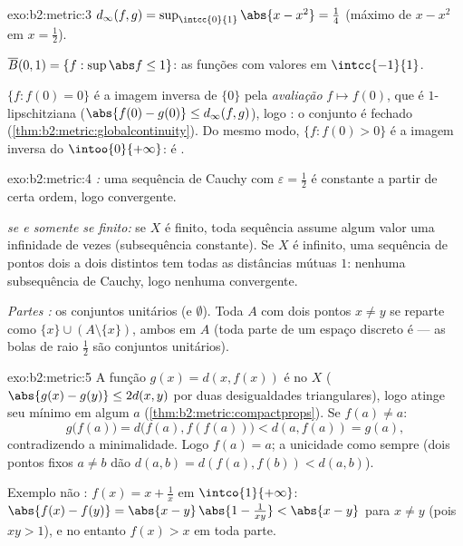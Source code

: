 \begin{solution}{exo:b2:metric:3}
$d_\infty(f, g) = \sup_{\intcc{0}{1}} \abs{x - x^2} = \frac14$
(máximo de $x - x^2$ em $x = \frac12$).

$\overline B(0, 1) = \{f : \sup\abs f \leq 1\}$: as funções
 com valores em $\intcc{-1}{1}$.

$\{f : f(0) = 0\}$ é a imagem inversa de $\{0\}$ pela
\emph{avaliação} $f \mapsto f(0)$, que é $1$-lipschitziana
($\abs{f(0) - g(0)} \leq d_\infty(f,g)$), logo : o conjunto
é fechado (\cref{thm:b2:metric:globalcontinuity}). Do mesmo modo, $\{f :
f(0) > 0\}$ é a imagem inversa do  $\intoo{0}{+\infty}$: é .
\end{solution}

\begin{solution}{exo:b2:metric:4}
\emph{:} uma sequência de Cauchy com $\varepsilon = \frac12$ é
constante a partir de certa ordem, logo convergente.

\emph{ se e somente se finito:} se $X$ é finito, toda sequência assume algum
valor uma infinidade de vezes (subsequência constante). Se $X$ é infinito,
uma sequência de pontos dois a dois distintos tem todas as distâncias mútuas $1$:
nenhuma subsequência de Cauchy, logo nenhuma convergente.

\emph{Partes :} os conjuntos unitários (e $\emptyset$). Toda $A$
com dois pontos $x \neq y$ se reparte como $\{x\} \cup (A
\setminus\{x\})$, ambos  em $A$ (toda parte de um espaço
discreto é  --- as bolas de raio $\frac12$ são conjuntos unitários).
\end{solution}

\begin{solution}{exo:b2:metric:5}
A função $g(x) = d(x, f(x))$ é  no  $X$
($\abs{g(x) - g(y)} \leq 2d(x,y)$ por duas desigualdades triangulares), logo
atinge seu mínimo em algum $a$
(\cref{thm:b2:metric:compactprops}). Se $f(a) \neq a$:
\[
g\bigl(f(a)\bigr) = d\bigl(f(a), f(f(a))\bigr) < d(a, f(a)) = g(a),
\]
contradizendo a minimalidade. Logo $f(a) = a$; a unicidade como sempre (dois
pontos fixos $a \neq b$ dão $d(a,b) = d(f(a), f(b)) < d(a,b)$).

Exemplo não : $f(x) = x + \frac1x$ em $\intco{1}{+\infty}$:
$\abs{f(x) - f(y)} = \abs{x - y}\,\abs{1 - \frac{1}{xy}} < \abs{x -
y}$ para $x \neq y$ (pois $xy > 1$), e no entanto $f(x) > x$ em toda parte.
\end{solution}

